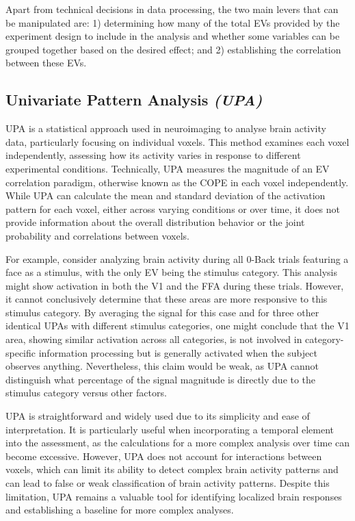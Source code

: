 
Apart from technical decisions in data processing, the two main levers that can be manipulated are: 1) determining how many of the total \gls{EV}s provided by the experiment design to include in the analysis and whether some variables can be grouped together based on the desired effect; and 2) establishing the correlation between these \gls{EV}s.

\subsection{Univariate Pattern Analysis \textit{(UPA)}}

\gls{UPA} is a statistical approach used in neuroimaging to analyse brain activity data, particularly focusing on individual voxels. This method examines each voxel independently, assessing how its activity varies in response to different experimental conditions. Technically, \gls{UPA} measures the magnitude of an \gls{EV} correlation paradigm, otherwise known as the \gls{COPE} in each voxel independently. While \gls{UPA} can calculate the mean and standard deviation of the activation pattern for each voxel, either across varying conditions or over time, it does not provide information about the overall distribution behavior or the joint probability and correlations between voxels.

For example, consider analyzing brain activity during all 0-Back trials featuring a face as a stimulus, with the only \gls{EV} being the stimulus category. This analysis might show activation in both the \gls{V1} and the \gls{FFA} during these trials. However, it cannot conclusively determine that these areas are more responsive to this stimulus category. By averaging the signal for this case and for three other identical \gls{UPA}s with different stimulus categories, one might conclude that the \gls{V1} area, showing similar activation across all categories, is not involved in category-specific information processing but is generally activated when the subject observes anything. Nevertheless, this claim would be weak, as \gls{UPA} cannot distinguish what percentage of the signal magnitude is directly due to the stimulus category versus other factors.

\gls{UPA} is straightforward and widely used due to its simplicity and ease of interpretation. It is particularly useful when incorporating a temporal element into the assessment, as the calculations for a more complex analysis over time can become excessive. However, \gls{UPA} does not account for interactions between voxels, which can limit its ability to detect complex brain activity patterns and can lead to false or weak classification of brain activity patterns. Despite this limitation, \gls{UPA} remains a valuable tool for identifying localized brain responses and establishing a baseline for more complex analyses.

